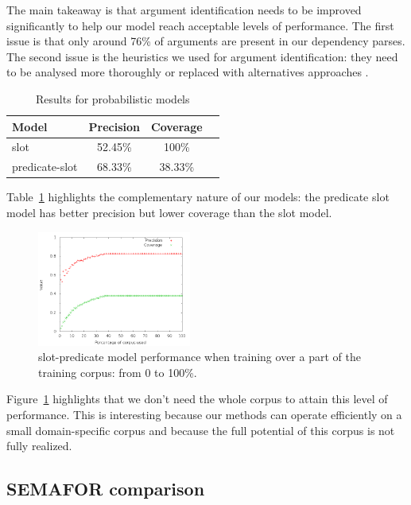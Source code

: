 The main takeaway is that argument identification needs to be improved
significantly to help our model reach acceptable levels of performance. The
first issue is that only around 76\% of arguments are present in our dependency
parses. The second issue is the heuristics we used for argument identification:
they need to be analysed more thoroughly or replaced with alternatives
approaches \citep{abend2009unsupervised}.

\begin{table}[ht]
    \centering
    \begin{tabular}{lccc}
        \toprule
        Model          & Precision & Coverage \\
        \midrule
        slot           & 52.45\% & 100\% \\
        predicate-slot & 68.33\% & 38.33\% \\
        \bottomrule
    \end{tabular}
    \caption{\protect\centering\label{table:probabilisticresults}Results for probabilistic models}
\end{table}

Table~\ref{table:probabilisticresults} highlights the complementary nature of
our models: the predicate slot model has better precision but lower coverage
than the slot model.

\begin{figure}[t]
    \centering
    \includegraphics[width=0.45\textwidth]{fig/slot-predicate-percents.png}
    \caption{\label{fig:slot_predicate} slot-predicate model performance when training over a part of the training corpus: from 0 to 100\%.}
\end{figure}

Figure~\ref{fig:slot_predicate} highlights that we don't need the whole corpus
to attain this level of performance. This is interesting because our methods
can operate efficiently on a small domain-specific corpus and because the full
potential of this corpus is not fully realized.

\subsection{SEMAFOR comparison}

